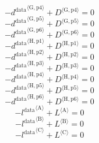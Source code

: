 \begin{equation}
-{d^{\mathrm{data}}}^{\langle \mathrm{\mathrm{G}},\mathrm{\mathrm{p4}}\rangle} + {D}^{\langle \mathrm{G},\mathrm{p4}\rangle} = 0
\end{equation}
\begin{equation}
-{d^{\mathrm{data}}}^{\langle \mathrm{\mathrm{G}},\mathrm{\mathrm{p5}}\rangle} + {D}^{\langle \mathrm{G},\mathrm{p5}\rangle} = 0
\end{equation}
\begin{equation}
-{d^{\mathrm{data}}}^{\langle \mathrm{\mathrm{G}},\mathrm{\mathrm{p6}}\rangle} + {D}^{\langle \mathrm{G},\mathrm{p6}\rangle} = 0
\end{equation}
\begin{equation}
-{d^{\mathrm{data}}}^{\langle \mathrm{\mathrm{H}},\mathrm{\mathrm{p1}}\rangle} + {D}^{\langle \mathrm{H},\mathrm{p1}\rangle} = 0
\end{equation}
\begin{equation}
-{d^{\mathrm{data}}}^{\langle \mathrm{\mathrm{H}},\mathrm{\mathrm{p2}}\rangle} + {D}^{\langle \mathrm{H},\mathrm{p2}\rangle} = 0
\end{equation}
\begin{equation}
-{d^{\mathrm{data}}}^{\langle \mathrm{\mathrm{H}},\mathrm{\mathrm{p3}}\rangle} + {D}^{\langle \mathrm{H},\mathrm{p3}\rangle} = 0
\end{equation}
\begin{equation}
-{d^{\mathrm{data}}}^{\langle \mathrm{\mathrm{H}},\mathrm{\mathrm{p4}}\rangle} + {D}^{\langle \mathrm{H},\mathrm{p4}\rangle} = 0
\end{equation}
\begin{equation}
-{d^{\mathrm{data}}}^{\langle \mathrm{\mathrm{H}},\mathrm{\mathrm{p5}}\rangle} + {D}^{\langle \mathrm{H},\mathrm{p5}\rangle} = 0
\end{equation}
\begin{equation}
-{d^{\mathrm{data}}}^{\langle \mathrm{\mathrm{H}},\mathrm{\mathrm{p6}}\rangle} + {D}^{\langle \mathrm{H},\mathrm{p6}\rangle} = 0
\end{equation}
\begin{equation}
-{l^{\mathrm{data}}}^{\langle \mathrm{\mathrm{A}}\rangle} + {L}^{\langle \mathrm{A}\rangle} = 0
\end{equation}
\begin{equation}
-{l^{\mathrm{data}}}^{\langle \mathrm{\mathrm{B}}\rangle} + {L}^{\langle \mathrm{B}\rangle} = 0
\end{equation}
\begin{equation}
-{l^{\mathrm{data}}}^{\langle \mathrm{\mathrm{C}}\rangle} + {L}^{\langle \mathrm{C}\rangle} = 0
\end{equation}
